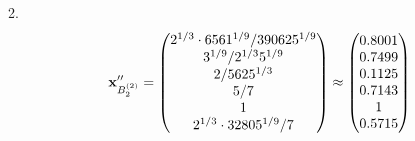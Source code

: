\documentclass[10pt,a4paper]{article}
\begin{document}
	2.
	\[
		\bold{x}''_{B_2^{(2)}} = 
		\begin{pmatrix}
			{{2^ {1 / 3}} \cdot {6561^ {1 / 9}}} / {{390625^ {1 / 9}}} \\
			{{3^ {1 / 9}}} / {{2^ {1 / 3}}{5^ {1 / 9}}} \\
			{{2}} / {{5625^ {1 / 3}}} \\
			{{5}} / {{7}} \\
			{1}{} \\
			{{2^ {1 / 3}} \cdot {32805^ {1 / 9}}} / {{7}} \\
		\end{pmatrix}
		\approx
		\begin{pmatrix}
			0.8001   \\
			0.7499   \\
			0.1125   \\
			0.7143   \\
			1        \\
			0.5715   \\
		\end{pmatrix}
	\]

\end{document}
